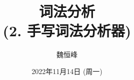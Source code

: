 \documentclass[]{beamer}
\title[词法分析]{词法分析 \\ (2. 手写词法分析器)}
\author[魏恒峰]{\large 魏恒峰}
\institute{hfwei@nju.edu.cn}
\date{2022年11月14日 (周一)}
\begin{document}
\maketitle


\thankyou{}

\end{document}
